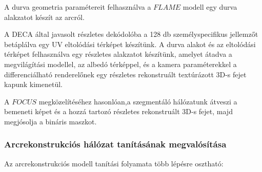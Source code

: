 \documentclass[12pt,a4]{article}
\begin{document}
 A durva geometria
	paramétereit felhasználva a $FLAME$ modell egy durva alakzatot készít az
	arcról. 
 
 A DECA által javasolt részletes dekódolóba a 128 db személyspecifikus jellemzőt betáplálva egy UV eltolódási térképet készítünk. A durva alakot és az eltolódási térképet felhasználva egy részletes alakzatot készítünk, amelyet átadva a megvilágítási modellel,
	az albedó térképpel, és a kamera paraméterekkel a differenciálható renderelőnek egy részletes rekonstruált textúrázott 3D-s fejet kapunk kimenetül.

 
	A $FOCUS$ megközelítéséhez hasonlóan,a szegmentáló hálózatunk átveszi
	a bemeneti képet és a hozzá tartozó részletes rekonstruált 3D-s fejet, majd
	megjósolja a bináris maszkot.

     \subsubsection{Arcrekonstrukciós hálózat tanításának megvalósítása}
    Az arcrekonstrukciós modell tanítási folyamata több lépésre osztható:
\end{document}
